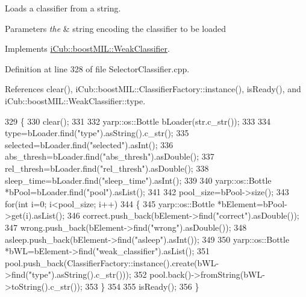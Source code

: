 Loads a classifier from a string. 


\begin{DoxyParams}{Parameters}
{\em the} & string encoding the classifier to be loaded \\
\hline
\end{DoxyParams}


Implements \hyperlink{classiCub_1_1boostMIL_1_1WeakClassifier_af7011a7e50ca01dea310c3d25fd3a84b}{i\+Cub\+::boost\+M\+I\+L\+::\+Weak\+Classifier}.



Definition at line 328 of file Selector\+Classifier.\+cpp.



References clear(), i\+Cub\+::boost\+M\+I\+L\+::\+Classifier\+Factory\+::instance(), is\+Ready(), and i\+Cub\+::boost\+M\+I\+L\+::\+Weak\+Classifier\+::type.


\begin{DoxyCode}
329 \{
330     clear();
331 
332     yarp::os::Bottle bLoader(str.c\_str());
333 
334     type=bLoader.find(\textcolor{stringliteral}{"type"}).asString().c\_str();
335     selected=bLoader.find(\textcolor{stringliteral}{"selected"}).asInt();
336     abs\_thresh=bLoader.find(\textcolor{stringliteral}{"abs\_thresh"}).asDouble();
337     rel\_thresh=bLoader.find(\textcolor{stringliteral}{"rel\_thresh"}).asDouble();
338     sleep\_time=bLoader.find(\textcolor{stringliteral}{"sleep\_time"}).asInt();
339 
340     yarp::os::Bottle *bPool=bLoader.find(\textcolor{stringliteral}{"pool"}).asList();
341 
342     pool\_size=bPool->size();
343     \textcolor{keywordflow}{for}(\textcolor{keywordtype}{int} i=0; i<pool\_size; i++)
344     \{
345         yarp::os::Bottle *bElement=bPool->get(i).asList();
346         correct.push\_back(bElement->find(\textcolor{stringliteral}{"correct"}).asDouble());
347         wrong.push\_back(bElement->find(\textcolor{stringliteral}{"wrong"}).asDouble());
348         asleep.push\_back(bElement->find(\textcolor{stringliteral}{"asleep"}).asInt());
349 
350         yarp::os::Bottle *bWL=bElement->find(\textcolor{stringliteral}{"weak\_classifier"}).asList();
351         pool.push\_back(ClassifierFactory::instance().create(bWL->find(\textcolor{stringliteral}{"type"}).asString().c\_str()));
352         pool.back()->fromString(bWL->toString().c\_str());
353     \}
354 
355     isReady();
356 \}
\end{DoxyCode}
